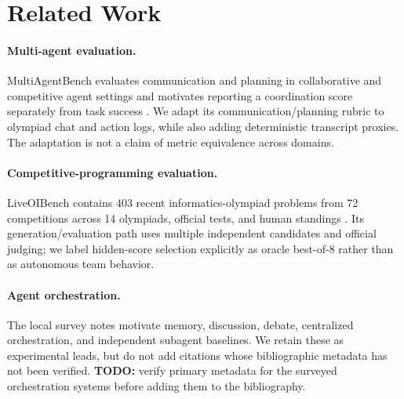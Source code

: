 \section{Related Work}
\paragraph{Multi-agent evaluation.}
MultiAgentBench evaluates communication and planning in collaborative and
competitive agent settings and motivates reporting a coordination score
separately from task success \cite{zhu2025multiagentbench}. We adapt its
communication/planning rubric to olympiad chat and action logs, while also
adding deterministic transcript proxies. The adaptation is not a claim of
metric equivalence across domains.

\paragraph{Competitive-programming evaluation.}
LiveOIBench contains 403 recent informatics-olympiad problems from 72
competitions across 14 olympiads, official tests, and human standings
\cite{zou2025liveoibench}. Its generation/evaluation path uses multiple
independent candidates and official judging; we label hidden-score selection
explicitly as oracle best-of-8 rather than as autonomous team behavior.

\paragraph{Agent orchestration.}
The local survey notes motivate memory, discussion, debate, centralized
orchestration, and independent subagent baselines. We retain these as
experimental leads, but do not add citations whose bibliographic metadata has
not been verified. \textbf{TODO:} verify primary metadata for the surveyed
orchestration systems before adding them to the bibliography.
